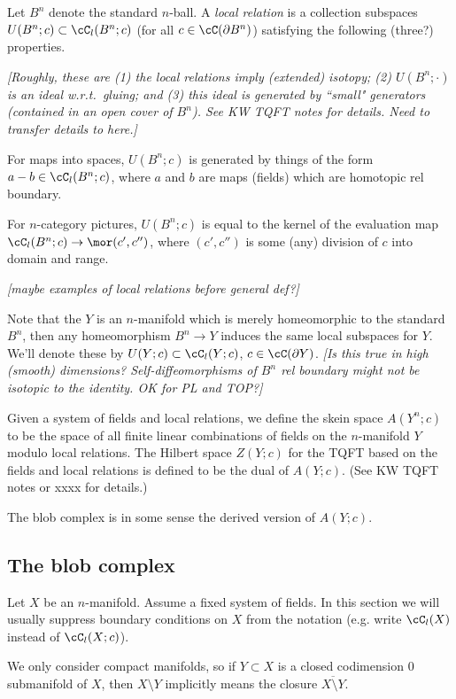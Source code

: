 \documentclass[11pt,leqno]{amsart}
\def\bd{\partial}
\def\sub{\subset}
\def\setmin{\setminus}
\def\nn#1{{{\it \small [#1]}}}
\begin{document}
Let $B^n$ denote the standard $n$-ball.
A {\it local relation} is a collection subspaces $U(B^n; c) \sub \cC_l(B^n; c)$
(for all $c \in \cC(\bd B^n)$) satisfying the following (three?) properties.

\nn{Roughly, these are (1) the local relations imply (extended) isotopy;
(2) $U(B^n; \cdot)$ is an ideal w.r.t.\ gluing; and
(3) this ideal is generated by ``small" generators (contained in an open cover of $B^n$).
See KW TQFT notes for details.  Need to transfer details to here.}

For maps into spaces, $U(B^n; c)$ is generated by things of the form $a-b \in \cC_l(B^n; c)$,
where $a$ and $b$ are maps (fields) which are homotopic rel boundary.

For $n$-category pictures, $U(B^n; c)$ is equal to the kernel of the evaluation map
$\cC_l(B^n; c) \to \mor(c', c'')$, where $(c', c'')$ is some (any) division of $c$ into
domain and range.

\nn{maybe examples of local relations before general def?}

Note that the $Y$ is an $n$-manifold which is merely homeomorphic to the standard $B^n$,
then any homeomorphism $B^n \to Y$ induces the same local subspaces for $Y$.
We'll denote these by $U(Y; c) \sub \cC_l(Y; c)$, $c \in \cC(\bd Y)$.
\nn{Is this true in high (smooth) dimensions?  Self-diffeomorphisms of $B^n$
rel boundary might not be isotopic to the identity.  OK for PL and TOP?}

Given a system of fields and local relations, we define the skein space
$A(Y^n; c)$ to be the space of all finite linear combinations of fields on
the $n$-manifold $Y$ modulo local relations.
The Hilbert space $Z(Y; c)$ for the TQFT based on the fields and local relations
is defined to be the dual of $A(Y; c)$.
(See KW TQFT notes or xxxx for details.)

The blob complex is in some sense the derived version of $A(Y; c)$.



\subsection{The blob complex}

Let $X$ be an $n$-manifold.
Assume a fixed system of fields.
In this section we will usually suppress boundary conditions on $X$ from the notation
(e.g. write $\cC_l(X)$ instead of $\cC_l(X; c)$).

We only consider compact manifolds, so if $Y \sub X$ is a closed codimension 0
submanifold of $X$, then $X \setmin Y$ implicitly means the closure
$\overline{X \setmin Y}$.
\end{document}
